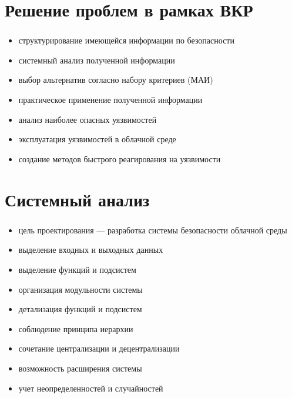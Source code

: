 
\section{Решение проблем в рамках ВКР}

\begin{frame}
\frametitle{\insertsection}

\begin{itemize}
    \item структурирование имеющейся информации по безопасности
    \item системный анализ полученной информации
    \item выбор альтернатив согласно набору критериев (МАИ)
    \item практическое применение полученной информации
    \item анализ наиболее опасных уязвимостей
    \item эксплуатация уязвимостей в облачной среде
    \item создание методов быстрого реагирования на уязвимости
\end{itemize}
\end{frame}


\section{Системный анализ}

\begin{frame}
\frametitle{\insertsection}

\begin{itemize}
    \item цель проектирования --- разработка системы безопасности облачной среды
    \item выделение входных и выходных данных
    \item выделение функций и подсистем
    \item организация модульности системы
    \item детализация функций и подсистем
    \item соблюдение принципа иерархии
    \item сочетание централизации и децентрализации
    \item возможность расширения системы
    \item учет неопределенностей и случайностей
\end{itemize}
\end{frame}

